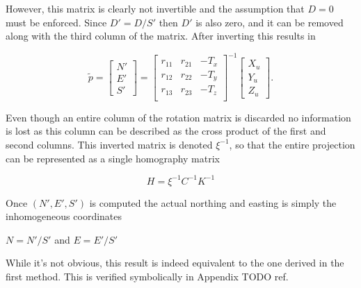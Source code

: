   However, this matrix is clearly not invertible and the assumption that $D=0$ must be enforced.  Since $D'=D/S'$ then $D'$ is also zero, and it can be removed along with the third column of the matrix.   After inverting this results in 
  
  \[
    \tilde{p} =
    \begin{bmatrix} N' \\ E' \\ S' \end{bmatrix}
      = 
    \begin{bmatrix} r_{11} & r_{21} & -T_x \\
                    r_{12} & r_{22} & -T_y \\
                    r_{13} & r_{23} & -T_z \\
    \end{bmatrix}^{-1}
    \begin{bmatrix} X_u \\ Y_u \\ Z_u \end{bmatrix}
  .
  \]
 
  Even though an entire column of the rotation matrix is discarded no information is lost as this column can be described as the cross product of the first and second columns.  This inverted matrix is denoted $\xi^{-1}$, so that the entire projection can be represented as a single homography matrix
  
 \begin{equation}
 H = \xi^{-1} C^{-1} K^{-1} 
 \label{equation:homography}
 \end{equation}
 
 Once $(N',E',S')$ is computed the actual northing and easting is simply the inhomogeneous coordinates
 
 \begin{center}
 $N=N'/S'$ and $E=E'/S'$
 \end{center}
 
 While it's not obvious, this result is indeed equivalent to the one derived in the first method.  This is verified symbolically in Appendix {TODO ref}.  
